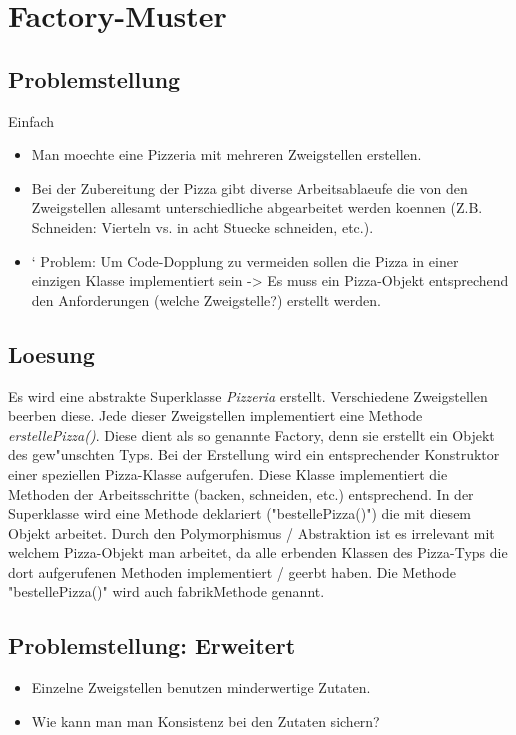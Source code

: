 \section{Factory-Muster}
\subsection{Problemstellung} Einfach
\begin{itemize}
\item Man moechte eine Pizzeria mit mehreren Zweigstellen erstellen.
\item Bei der Zubereitung der Pizza gibt diverse Arbeitsablaeufe die von den Zweigstellen allesamt 
  unterschiedliche abgearbeitet werden koennen (Z.B. Schneiden: Vierteln vs. in acht Stuecke 
  schneiden, etc.).
\item` Problem: Um Code-Dopplung zu vermeiden sollen die Pizza in einer einzigen Klasse implementiert 
  sein -> Es muss ein Pizza-Objekt entsprechend den Anforderungen (welche Zweigstelle?) erstellt 
  werden. 
\end{itemize}
  
\subsection{Loesung}
Es wird eine abstrakte Superklasse \emph{Pizzeria} erstellt. Verschiedene Zweigstellen beerben diese. 
Jede dieser Zweigstellen implementiert eine Methode \emph{erstellePizza()}. Diese dient als so 
genannte Factory, denn sie erstellt ein Objekt des gew"unschten Typs. Bei der Erstellung wird ein 
entsprechender Konstruktor einer speziellen Pizza-Klasse aufgerufen. Diese Klasse implementiert 
die Methoden der Arbeitsschritte (backen, schneiden, etc.) entsprechend. In der Superklasse wird 
eine Methode deklariert ("bestellePizza()") die mit diesem Objekt arbeitet. Durch den 
Polymorphismus / Abstraktion ist es irrelevant mit welchem Pizza-Objekt man arbeitet, da alle 
erbenden Klassen des Pizza-Typs die dort aufgerufenen Methoden implementiert / geerbt haben. Die 
Methode "bestellePizza()" wird auch fabrikMethode genannt.



\subsection{Problemstellung: Erweitert}
\begin{itemize}
\item Einzelne Zweigstellen benutzen minderwertige Zutaten.
\item Wie kann man man Konsistenz bei den Zutaten sichern?
\end{itemize}

